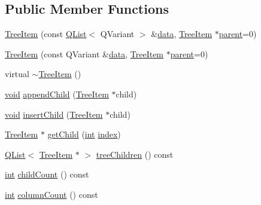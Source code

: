 \subsection*{Public Member Functions}
\begin{DoxyCompactItemize}
\item 
\hyperlink{group___u_a_v_object_browser_plugin_gaee288dea1233cde85e888cd709a5385e}{Tree\-Item} (const \hyperlink{class_q_list}{Q\-List}$<$ Q\-Variant $>$ \&\hyperlink{glext_8h_a8850df0785e6fbcc2351af3b686b8c7a}{data}, \hyperlink{class_tree_item}{Tree\-Item} $\ast$\hyperlink{group___u_a_v_object_browser_plugin_gaa3a7ba624312b6be70872634db291881}{parent}=0)
\item 
\hyperlink{group___u_a_v_object_browser_plugin_ga18da596c178ccc1c830ac82d1896be1d}{Tree\-Item} (const Q\-Variant \&\hyperlink{glext_8h_a8850df0785e6fbcc2351af3b686b8c7a}{data}, \hyperlink{class_tree_item}{Tree\-Item} $\ast$\hyperlink{group___u_a_v_object_browser_plugin_gaa3a7ba624312b6be70872634db291881}{parent}=0)
\item 
virtual \hyperlink{group___u_a_v_object_browser_plugin_ga859429185d908c3e54861bbbfb185425}{$\sim$\-Tree\-Item} ()
\item 
\hyperlink{group___u_a_v_objects_plugin_ga444cf2ff3f0ecbe028adce838d373f5c}{void} \hyperlink{group___u_a_v_object_browser_plugin_gac7f432ac0587ca037e80857eefd622f8}{append\-Child} (\hyperlink{class_tree_item}{Tree\-Item} $\ast$child)
\item 
\hyperlink{group___u_a_v_objects_plugin_ga444cf2ff3f0ecbe028adce838d373f5c}{void} \hyperlink{group___u_a_v_object_browser_plugin_ga1d0b952f15a93167dadb41667ccc5e4c}{insert\-Child} (\hyperlink{class_tree_item}{Tree\-Item} $\ast$child)
\item 
\hyperlink{class_tree_item}{Tree\-Item} $\ast$ \hyperlink{group___u_a_v_object_browser_plugin_gae115cb3e046c94117d64ee87764cb3ef}{get\-Child} (\hyperlink{ioapi_8h_a787fa3cf048117ba7123753c1e74fcd6}{int} \hyperlink{glext_8h_ab47dd9958bcadea08866b42bf358e95e}{index})
\item 
\hyperlink{class_q_list}{Q\-List}$<$ \hyperlink{class_tree_item}{Tree\-Item} $\ast$ $>$ \hyperlink{group___u_a_v_object_browser_plugin_gaa56dc80d617c2c9bd914abe5da774fd8}{tree\-Children} () const 
\item 
\hyperlink{ioapi_8h_a787fa3cf048117ba7123753c1e74fcd6}{int} \hyperlink{group___u_a_v_object_browser_plugin_ga55ffe6dd27750e479034b93e753f87af}{child\-Count} () const 
\item 
\hyperlink{ioapi_8h_a787fa3cf048117ba7123753c1e74fcd6}{int} \hyperlink{group___u_a_v_object_browser_plugin_ga31c3fb89ad8e19ae696a310a1f843a8e}{column\-Count} () const 

\end{DoxyCompactItemize}
